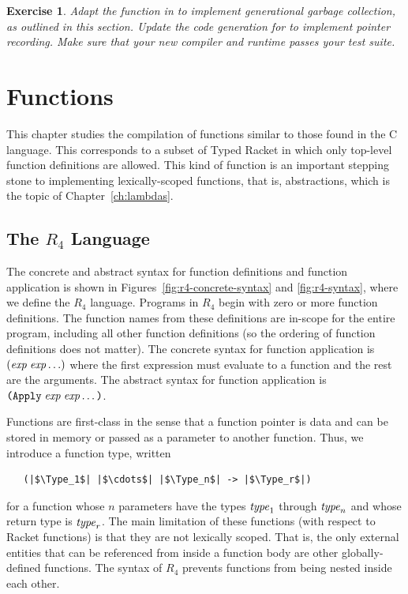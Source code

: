 \documentclass[11pt]{book}
\newtheorem{exercise}[theorem]{Exercise}
\begin{document}
\begin{exercise}\normalfont
  Adapt the  function in  to implement
  generational garbage collection, as outlined in this section.
  Update the code generation for  to implement
  pointer recording. Make sure that your new compiler and runtime
  passes your test suite.
\end{exercise}


\chapter{Functions}
\label{ch:functions}

This chapter studies the compilation of functions similar to those
found in the C language. This corresponds to a subset of Typed Racket
in which only top-level function definitions are allowed. This kind of
function is an important stepping stone to implementing
lexically-scoped functions, that is,  abstractions, which
is the topic of Chapter~\ref{ch:lambdas}.

\section{The $R_4$ Language}

The concrete and abstract syntax for function definitions and function
application is shown in Figures~\ref{fig:r4-concrete-syntax} and
\ref{fig:r4-syntax}, where we define the $R_4$ language.  Programs in
$R_4$ begin with zero or more function definitions.  The function
names from these definitions are in-scope for the entire program,
including all other function definitions (so the ordering of function
definitions does not matter). The concrete syntax for function
application is $(\mathit{exp} \; \mathit{exp} \ldots)$
where the first expression must
evaluate to a function and the rest are the arguments.
The abstract syntax for function application is
$\texttt{(Apply}\;\mathit{exp}\;\mathit{exp}\ldots\texttt{)}$.


Functions are first-class in the sense that a function pointer
 is data and can be stored in memory or passed
as a parameter to another function.  Thus, we introduce a function
type, written
\begin{lstlisting}
   (|$\Type_1$| |$\cdots$| |$\Type_n$| -> |$\Type_r$|)
\end{lstlisting}
for a function whose $n$ parameters have the types $\mathit{type}_1$ through
$\mathit{type}_n$ and whose return type is $\mathit{type}_r$. The main limitation of
these functions (with respect to Racket functions) is that they are
not lexically scoped. That is, the only external entities that can be
referenced from inside a function body are other globally-defined
functions. The syntax of $R_4$ prevents functions from being nested
inside each other.
\end{document}
